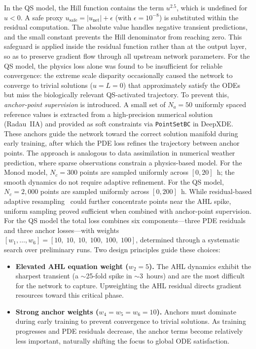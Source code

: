 \documentclass[14pt,a4paper,openany]{extbook}
\begin{document}
In the QS model, the Hill function contains the term $u^{2.5}$, which is
undefined for $u < 0$. A safe proxy
$u_{\mathrm{safe}} = |u_{\mathrm{net}}| + \epsilon$ (with
$\epsilon = 10^{-8}$) is substituted within the residual computation.  The
absolute value handles negative transient predictions, and the small
constant prevents the Hill denominator from reaching zero. This safeguard
is applied inside the residual function rather than at the output layer, so
as to preserve gradient flow through all upstream network parameters. For the QS model, the physics loss alone was found to be insufficient for
reliable convergence: the extreme scale disparity occasionally caused the
network to converge to trivial solutions ($u = L = 0$) that approximately
satisfy the ODEs but miss the biologically relevant QS-activated trajectory. To prevent this, \emph{anchor-point supervision} is introduced. A small set of $N_a = 50$ uniformly spaced reference values is extracted from a high-precision numerical solution (Radau~IIA) and provided as soft constraints via \texttt{PointSetBC} in DeepXDE. These anchors guide the network toward the correct solution manifold during early training, after which the PDE loss refines the trajectory between anchor points. The approach is analogous to data assimilation in numerical weather prediction, where sparse observations constrain a physics-based model.
For the Monod model, $N_c = 300$ points are sampled uniformly across
$[0, 20]$~h; the smooth dynamics do not require adaptive refinement.  For
the QS model, $N_c = 2{,}000$ points are sampled uniformly across
$[0, 200]$~h.  While residual-based adaptive
resampling~\cite{wight2021solving} could further concentrate points near the AHL spike, uniform sampling proved sufficient when combined with
anchor-point supervision.
For the QS model the total loss combines six components---three PDE
residuals and three anchor losses---with weights
$[w_1,\dots, w_6] = [10,\; 10,\; 10,\; 100,\; 100,\; 100]$, determined through
a systematic search over preliminary runs.  Two design principles guide
these choices:
\begin{itemize}
    \item \textbf{Elevated AHL equation weight ($w_2 = 5$).}
    The AHL dynamics exhibit the sharpest transient (a $\sim$25-fold spike
    in $\sim$3~hours) and are the most difficult for the network to
    capture.  Upweighting the AHL residual directs gradient resources
    toward this critical phase.

    \item \textbf{Strong anchor weights ($w_4 = w_5 = w_6 = 10$).}
    Anchors must dominate during early training to prevent convergence to
    trivial solutions.  As training progresses and PDE residuals decrease,
    the anchor terms become relatively less important, naturally shifting
    the focus to global ODE satisfaction.
\end{itemize}
\end{document}
